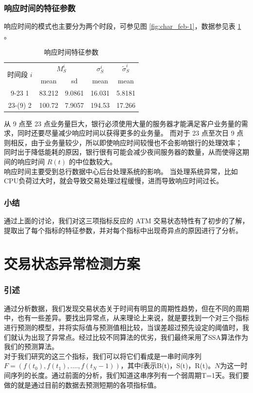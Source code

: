\documentclass[a4paper]{article}
\begin{document}
\section{响应时间的特征参数}
\indent 响应时间的模式也主要分为两个时段，可参见图 \ref{fig:char_feb-1}，数据参见表 \ref{tab:char_R} 。
\begin{table}[H]
	\centering
	\caption{响应时间特征参数}
	\label{tab:char_R}
	\begin{tabular}{c|cc|c|c}
		\hline
		\multirow{2}{*}{时间段 $i$} & \multicolumn{2}{c}{$M_S^i$} & $\sigma_S^i$ & $\tilde{\sigma}_S^i$ \\
		& mean        & sd            & mean        & mean                 \\
		\hline
		9-23 1                   & 83.212     & 9.0861    & 16.031   & 5.8181            \\
		23-(9) 2                 & 100.72     & 7.9057     & 194.53      & 17.266            \\
		\hline
	\end{tabular}
\end{table}
从 9 点至 23 点业务量巨大，银行必须使用大量的服务器才能满足客户业务量的需求，同时还要尽量减少响应时间以获得更多的业务量。
而对于 23 点至次日 9 点则相反，由于业务量较少，所以即使响应时间较慢也不会影响银行的处理效率；
同时出于降低能耗的原因，银行很有可能会减少夜间服务器的数量，从而使得这期间的响应时间 $R(t)$ 的中位数较大。
\\
\indent 响应时间主要受到总行数据中心后台处理系统的影响。
当处理系统异常，比如CPU负荷过大时，就会导致交易处理过程缓慢，进而导致响应时间过长。

\section*{小结}
通过上面的讨论，我们对这三项指标反应的 ATM 交易状态特性有了初步的了解，提取出了每个指标的特征参数，并对每个指标中出现奇异点的原因进行了分析。

\part{交易状态异常检测方案}
\section{引述}
\indent 通过分析数据，我们发现交易状态关于时间有明显的周期性趋势，但在不同的周期中，也有一些差异。要找出异常点，从来理论上来说，就是要找到一个对三个指标进行预测的模型，并将实际值与预测值相比较，当误差超过预先设定的阈值时，我们就认为出现了异常点。经过比较不同算法的优劣，我们最终采用了SSA算法作为我们的预测算法。  \\
\indent 对于我们研究的这三个指标，我们可以将它们看成是一串时间序列$F=(f(t_0),f(t_1),....,f(t_N-1))$，其中f表示B(t)，S(t)，R(t)。$N$为这一时间序列的长度。通过前面的分析，我们知道这串序列有一个弱周期T=1天。我们要做的就是通过目前的数据去预测短期的各项指标值。
\end{document}
